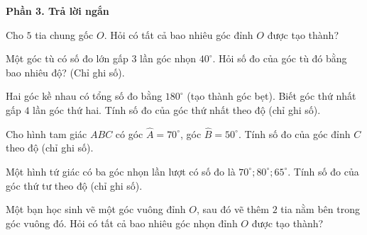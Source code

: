 \textbf{Phần 3. Trả lời ngắn}

\begin{ex} %
Cho $5$ tia chung gốc $O$. Hỏi có tất cả bao nhiêu góc đỉnh $O$ được tạo thành?
\end{ex}

\begin{ex} %
Một góc tù có số đo lớn gấp $3$ lần góc nhọn $40^\circ$. Hỏi số đo của góc tù đó bằng bao nhiêu độ? (Chỉ ghi số).
\end{ex}

\begin{ex} %
Hai góc kề nhau có tổng số đo bằng $180^\circ$ (tạo thành góc bẹt). Biết góc thứ nhất gấp $4$ lần góc thứ hai. Tính số đo của góc thứ nhất theo độ (chỉ ghi số).
\end{ex}

\begin{ex} %
Cho hình tam giác $ABC$ có góc $\widehat{A} = 70^\circ$, góc $\widehat{B} = 50^\circ$. Tính số đo của góc đỉnh $C$ theo độ (chỉ ghi số).
\end{ex}

\begin{ex} %
Một hình tứ giác có ba góc nhọn lần lượt có số đo là $70^\circ; 80^\circ; 65^\circ$. Tính số đo của góc thứ tư theo độ (chỉ ghi số).
\end{ex}

\begin{ex} %
Một bạn học sinh vẽ một góc vuông đỉnh $O$, sau đó vẽ thêm $2$ tia nằm bên trong góc vuông đó. Hỏi có tất cả bao nhiêu góc nhọn đỉnh $O$ được tạo thành?
\end{ex}
